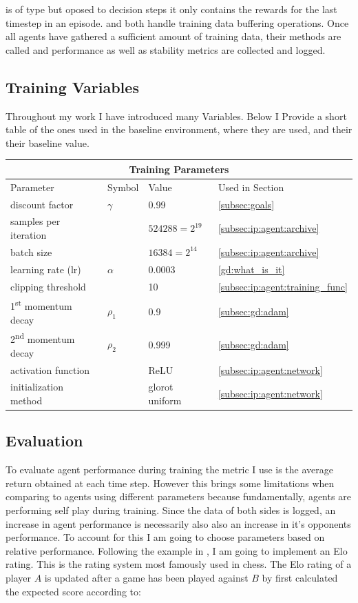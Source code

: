  is of type  but oposed to decision steps it only contains the rewards for the last timestep in an episode.  and  both handle training data buffering operations. Once all agents have gathered a sufficient amount of training data, their  methods are called and performance as well as stability metrics are collected and logged.

\subsection{Training Variables}\label{subsec:ip:tt:params}
Throughout my work I have introduced many Variables. Below I Provide a short table of the ones used in the baseline environment, where they are used, and their their baseline value. \\
\begin{tabular}{ |p{4cm}||p{3cm}|p{3cm}|p{3cm}|  }
 \hline
 \multicolumn{4}{|c|}{Training Parameters} \\
 \hline
 Parameter & Symbol & Value & Used in Section\\
 \hline
 discount factor & $\gamma$ & 0.99 & \ref{subsec:goals}\\
 samples per iteration &  & $524288 = 2^19$ & \ref{subsec:ip:agent:archive}\\
 batch size &  & $16384 = 2^{14}$ &  \ref{subsec:ip:agent:archive}\\
 learning rate (lr) & $\alpha$ & 0.0003 & \ref{gd:what_is_it}\\
 clipping threshold &  & 10 & \ref{subsec:ip:agent:training_func}\\
 1\textsuperscript{st} momentum decay & $\rho_1$ & 0.9 & \ref{subsec:gd:adam}\\
 2\textsuperscript{nd} momentum decay & $\rho_2$ & 0.999 & \ref{subsec:gd:adam}\\
 activation function &  & ReLU & \ref{subsec:ip:agent:network}\\
 initialization method &  & glorot uniform & \ref{subsec:ip:agent:network}\\
 
 \hline
\end{tabular}

\subsection{Evaluation}\label{subsec:ip:tt:eval} 
To evaluate agent performance during training the metric I use is the average return obtained at each time step. However this brings some limitations when comparing to agents using different parameters because fundamentally, agents are performing self play during training. Since the data of both sides is logged, an increase in agent performance is necessarily also also an increase in it's opponents performance. To account for this I am going to choose parameters based on relative performance. Following the example in \cite{juliani2020unity}, I am going to implement an Elo rating. This is the rating system most famously used in chess. The Elo rating of a player $A$ is updated after a game has been played against $B$ by first calculated the expected score according to:

